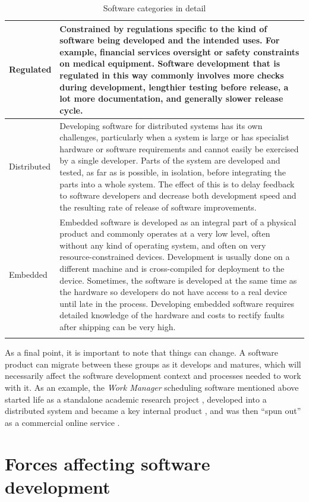 \begin{longtable}{p{2.5cm} | p{10cm}}
\\
\hline
Regulated & Constrained by regulations specific to the kind of software being developed and the intended uses. For example, financial services oversight or safety constraints on medical equipment. Software development that is regulated in this way commonly involves more checks during development, lengthier testing before release, a lot more documentation, and generally slower release cycle.
\\
\hline
Distributed \label{A33} & Developing software for distributed systems has its own challenges, particularly when a system is large or has specialist hardware or software requirements and cannot easily be exercised by a single developer. Parts of the system are developed and tested, as far as is possible, in isolation, before integrating the parts into a whole system. The effect of this is to delay feedback to software developers and decrease both development speed and the resulting rate of release of software improvements.
\\
\hline
Embedded & Embedded software is developed as an integral part of a physical product and commonly operates at a very low level, often without any kind of operating system, and often on very resource-constrained devices. Development is usually done on a different machine and is \gls{cross-compile}d for deployment to the device. Sometimes, the software is developed at the same time as the hardware so developers do not have access to a real device until late in the process. Developing embedded software requires detailed knowledge of the hardware and costs to rectify faults after shipping can be very high.
\\
\hline
\caption{Software categories in detail\label{table:software}}
\end{longtable}

As a final point, it is important to note that things can change. A software product can migrate between these groups as it develops and matures, which will necessarily affect the software development context and processes needed to work with it. As an example, the \emph{Work Manager} scheduling software mentioned above started life as a standalone academic research project \citep{Lesaint2003}, developed into a distributed system and became a key internal product \citep{Garwood1997}, and was then \enquote{spun out} as a commercial online service \citep{Trimble2006}.

\section{Forces affecting software development}
\label{software:forces}

